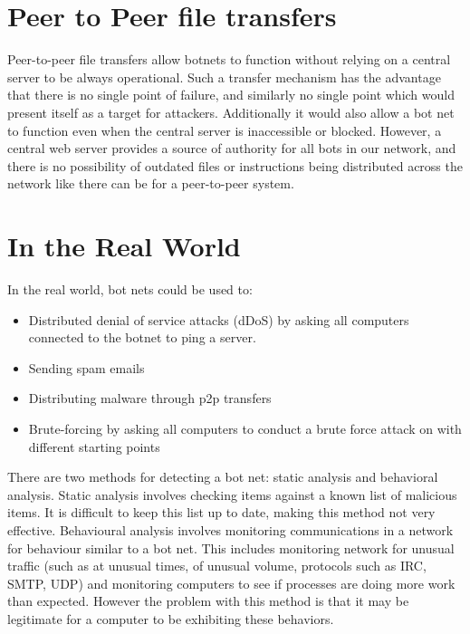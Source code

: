 \documentclass[9pt,a4paper]{article}
\begin{document}
\section{Peer to Peer file transfers}
\vspace{-2ex}
Peer-to-peer file transfers allow botnets to function without relying on a central server to be always operational. Such a transfer mechanism has the advantage that there is no single point of failure, and similarly no single point which would present itself as a target for attackers. Additionally it would also allow a bot net to function even when the central server is inaccessible or blocked. However, a central web server provides a source of authority for all bots in our network, and there is no possibility of outdated files or instructions being distributed across the network like there can be for a peer-to-peer system.

\section{In the Real World}
\vspace{-2ex}
In the real world, bot nets could be used to:
\begin{itemize}
\item Distributed denial of service attacks (dDoS) by asking all computers connected to the botnet to ping a server.
\item Sending spam emails
\item Distributing malware through p2p transfers
\item Brute-forcing by asking all computers to conduct a brute force attack on with different starting points
\end{itemize}

There are two methods for detecting a bot net: static analysis and behavioral analysis. Static analysis involves checking items against a known list of malicious items. It is difficult to keep this list up to date, making this method not very effective. Behavioural analysis involves monitoring communications in a network for behaviour similar to a bot net. This includes  monitoring network for unusual traffic (such as at unusual times, of unusual volume, protocols such as IRC, SMTP, UDP) and monitoring computers to see if processes are doing more work than expected. However the problem with this method is that it may be legitimate for a computer to be exhibiting these behaviors.
\end{document}

